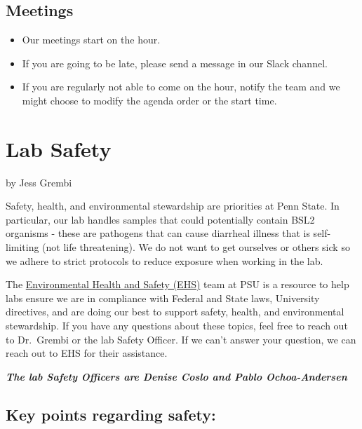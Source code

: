 \documentclass[
]{book}
\providecommand{\tightlist}{%
  \setlength{\itemsep}{0pt}\setlength{\parskip}{0pt}}
\begin{document}
\section{Meetings}\label{meetings}

\begin{itemize}
\tightlist
\item
  Our meetings start on the hour.
\item
  If you are going to be late, please send a message in our Slack channel.
\item
  If you are regularly not able to come on the hour, notify the team and we might choose to modify the agenda order or the start time.
\end{itemize}

\chapter{Lab Safety}\label{lab-safety}

by Jess Grembi

Safety, health, and environmental stewardship are priorities at Penn State. In particular, our lab handles samples that could potentially contain BSL2 organisms - these are pathogens that can cause diarrheal illness that is self-limiting (not life threatening). We do not want to get ourselves or others sick so we adhere to strict protocols to reduce exposure when working in the lab.

The \href{https://ehs.psu.edu/}{Environmental Health and Safety (EHS)} team at PSU is a resource to help labs ensure we are in compliance with Federal and State laws, University directives, and are doing our best to support safety, health, and environmental stewardship. If you have any questions about these topics, feel free to reach out to Dr.~Grembi or the lab Safety Officer. If we can't answer your question, we can reach out to EHS for their assistance.

\textbf{\emph{The lab Safety Officers are Denise Coslo and Pablo Ochoa-Andersen}}

\section{Key points regarding safety:}\label{key-points-regarding-safety}
\end{document}
